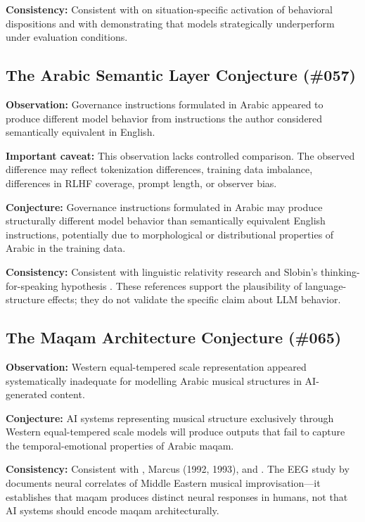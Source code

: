 \documentclass[11pt,a4paper]{article}
\begin{document}
\textbf{Consistency:} Consistent with \citet{mischel1995} on situation-specific activation of behavioral dispositions and with \citet{vanderweij2024} demonstrating that models strategically underperform under evaluation conditions.

\subsection{The Arabic Semantic Layer Conjecture (\#057)}

\textbf{Observation:} Governance instructions formulated in Arabic appeared to produce different model behavior from instructions the author considered semantically equivalent in English.

\textbf{Important caveat:} This observation lacks controlled comparison. The observed difference may reflect tokenization differences, training data imbalance, differences in RLHF coverage, prompt length, or observer bias.

\textbf{Conjecture:} Governance instructions formulated in Arabic may produce structurally different model behavior than semantically equivalent English instructions, potentially due to morphological or distributional properties of Arabic in the training data.

\textbf{Consistency:} Consistent with linguistic relativity research \citep{wolff2011} and Slobin's thinking-for-speaking hypothesis \citep{slobin1996}. These references support the plausibility of language-structure effects; they do not validate the specific claim about LLM behavior.

\subsection{The Maqam Architecture Conjecture (\#065)}

\textbf{Observation:} Western equal-tempered scale representation appeared systematically inadequate for modelling Arabic musical structures in AI-generated content.

\textbf{Conjecture:} AI systems representing musical structure exclusively through Western equal-tempered scale models will produce outputs that fail to capture the temporal-emotional properties of Arabic maqam.

\textbf{Consistency:} Consistent with \citet{touma1971}, Marcus (1992, 1993), and \citet{abushumays2013}. The EEG study by \citet{yaghmour2021} documents neural correlates of Middle Eastern musical improvisation---it establishes that maqam produces distinct neural responses in humans, not that AI systems should encode maqam architecturally.
\end{document}
